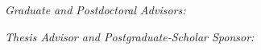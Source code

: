\vspace{12pt}
\emph{Graduate and Postdoctoral Advisors:}

\vspace{12pt}
\emph{Thesis Advisor and Postgraduate-Scholar Sponsor:}


